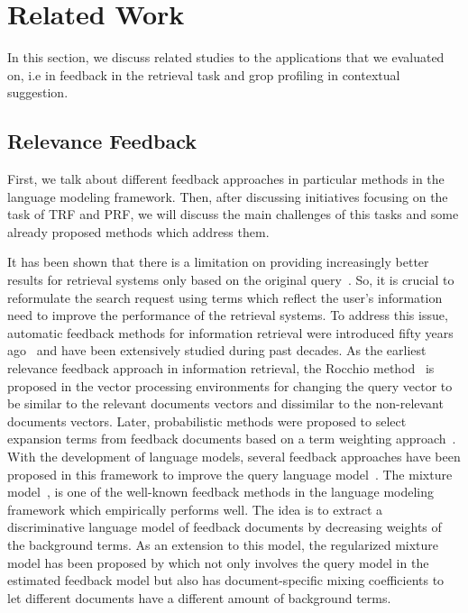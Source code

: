 \section{Related Work}
In this section, we discuss related studies to the applications that we evaluated \acswlm on, i.e in feedback in the retrieval task and grop profiling in contextual suggestion. 

\subsection{Relevance Feedback}
First, we talk about different feedback approaches in particular methods in the language modeling framework. Then, after discussing initiatives focusing on the task of TRF and PRF, we will discuss the main challenges of this tasks and some already proposed methods which address them.

It has been shown that there is a limitation on providing increasingly better results for retrieval systems only based on the original query~\citep{Rijsbergen:1986}. So, it is crucial to reformulate the search request using terms which reflect the user's information need to improve the performance of the retrieval systems. 
To address this issue, automatic feedback methods for information retrieval were introduced fifty years ago~\citep{Rocchio:1971} and have been extensively studied  during past decades.
As the earliest relevance feedback approach in information retrieval, the Rocchio method~\citep{Rocchio:1971} is proposed in the vector processing environments for changing the query vector to be similar to the relevant documents vectors and dissimilar to the non-relevant documents vectors. 
Later, probabilistic methods were proposed to select expansion terms from feedback documents based on a term weighting approach~\citep{Robertson:1976,Rijsbergen:1981}. With the development of language models, several feedback approaches have been proposed in this framework to improve the query language model~\citep{Zhai:SMM:2001,Tao:2006,Lavrenko:2001,Hiemstra:2004,Lv:2014}. 
The mixture model~\citep{Zhai:SMM:2001}, is one of the well-known feedback methods in the language modeling framework which empirically performs well. The idea is to extract a discriminative language model of feedback documents by decreasing weights of the background terms. 
As an extension to this model, the regularized mixture model has been proposed by \citet{Tao:2006} which not only involves the query model in the estimated feedback model but also has document-specific mixing coefficients to let different documents have a different amount of background terms.


